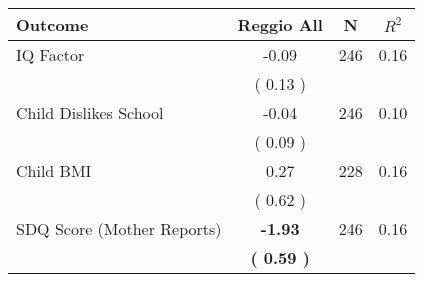 \begin{tabular}{lccc}
\toprule
 \textbf{Outcome} & \textbf{Reggio All} & \textbf{N} & \textbf{$ R^2$} \\
\midrule
IQ Factor &     -0.09 & 246 &      0.16 \\ 
 & (     0.13 ) & \\
Child Dislikes School &     -0.04 & 246 &      0.10 \\ 
 & (     0.09 ) & \\
Child BMI &      0.27 & 228 &      0.16 \\ 
 & (     0.62 ) & \\
SDQ Score (Mother Reports) & \textbf{    -1.93} & 246 &      0.16 \\ 
 & \textbf{(     0.59 )} & \\
\bottomrule
\end{tabular}
